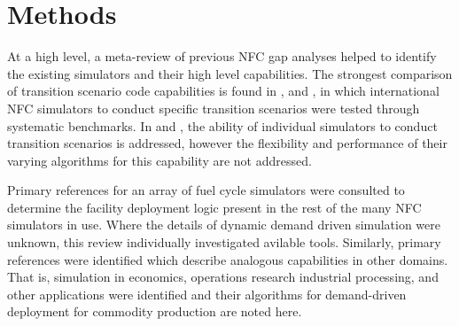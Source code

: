 \section{Methods}
At a high level, a meta-review of previous \gls{NFC} gap analyses 
helped to identify the existing simulators and their high 
level capabilities. The strongest comparison of transition scenario code 
capabilities is found in \cite{boucher_international_2010}, 
\cite{brown_identification_2016} and \cite{mccarthy_benchmark_2012}, in which 
international \gls{NFC} simulators to conduct specific transition scenarios 
were tested through systematic benchmarks. In 
\cite{carre_overview_2009} and \cite{hoffman_expanded_2016}, the ability of individual 
simulators to conduct transition scenarios is addressed, however the 
flexibility and performance of their varying algorithms for this capability are 
not addressed.

Primary references for an array of fuel cycle simulators were consulted to 
determine the facility deployment logic present in the rest of the many 
\gls{NFC} simulators in use. Where the details of dynamic demand driven 
simulation were unknown, this review individually investigated avilable tools. 
Similarly, primary references were identified which describe analogous 
capabilities in other domains. That is, simulation in economics, 
operations research industrial processing, and other applications were identified and 
their algorithms for demand-driven deployment for commodity production are 
noted here.
